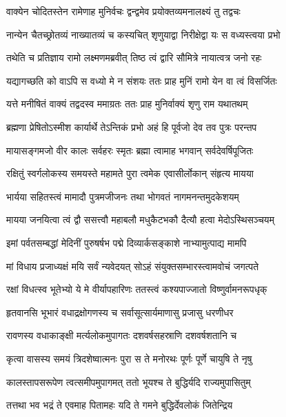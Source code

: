 \twolineshloka
{वाक्येन चोदितस्तेन रामेणाह मुनिर्वचः}
{द्वन्द्वमेव प्रयोक्तव्यमनालक्ष्यं तु तद्वचः} %

\twolineshloka
{नान्येन चैतच्छ्रोतव्यं नाख्यातव्यं च कस्यचित्}
{शृणुयाद्वा निरीक्षेद्वा यः स वध्यस्त्वया प्रभो} %

\twolineshloka
{तथेति च प्रतिज्ञाय रामो लक्ष्मणमब्रवीत्}
{तिष्ठ त्वं द्वारि सौमित्रे नायात्वत्र जनो रहः} %

\twolineshloka
{यद्यागच्छति को वाऽपि स वध्यो मे न संशयः}
{ततः प्राह मुनिं रामो येन वा त्वं विसर्जितः} %

\twolineshloka
{यत्ते मनीषितं वाक्यं तद्वदस्व ममाग्रतः}
{ततः प्राह मुनिर्वाक्यं शृणु राम यथातथम्} %

\twolineshloka
{ब्रह्मणा प्रेषितोऽस्मीश कार्यार्थे तेऽन्तिकं प्रभो}
{अहं हि पूर्वजो देव तव पुत्रः परन्तप} %

\twolineshloka
{मायासङ्गमजो वीर कालः सर्वहरः स्मृतः}
{ब्रह्मा त्वामाह भगवान् सर्वदेवर्षिपूजितः} %

\twolineshloka
{रक्षितुं स्वर्गलोकस्य समयस्ते महामते}
{पुरा त्वमेक एवासीर्लोकान् संहृत्य मायया} %

\twolineshloka
{भार्यया सहितस्त्वं मामादौ पुत्रमजीजनः}
{तथा भोगवतं नागमनन्तमुदकेशयम्} %

\twolineshloka
{मायया जनयित्वा त्वं द्वौ ससत्त्वौ महाबलौ}
{मधुकैटभकौ दैत्यौ हत्वा मेदोऽस्थिसञ्चयम्} %

\twolineshloka
{इमां पर्वतसम्बद्धां मेदिनीं पुरुषर्षभ}
{पद्मे दिव्यार्कसङ्काशे नाभ्यामुत्पाद्य मामपि} %

\twolineshloka
{मां विधाय प्रजाध्यक्षं मयि सर्वं न्यवेदयत्}
{सोऽहं संयुक्तसम्भारस्त्वामवोचं जगत्पते} %

\twolineshloka
{रक्षां विधत्स्व भूतेभ्यो ये मे वीर्यापहारिणः}
{ततस्त्वं कश्यपाज्जातो विष्णुर्वामनरूपधृक्} %

\twolineshloka
{हृतवानसि भूभारं वधाद्रक्षोगणस्य च}
{सर्वासूत्सार्यमाणासु प्रजासु धरणीधर} %

\twolineshloka
{रावणस्य वधाकाङ्क्षी मर्त्यलोकमुपागतः}
{दशवर्षसहस्राणि दशवर्षशतानि च} %

\twolineshloka
{कृत्वा वासस्य समयं त्रिदशेष्वात्मनः पुरा}
{स ते मनोरथः पूर्णः पूर्णे चायुषि ते नृषु} %

\twolineshloka
{कालस्तापसरूपेण त्वत्समीपमुपागमत्}
{ततो भूयश्च ते बुद्धिर्यदि राज्यमुपासितुम्} %

\twolineshloka
{तत्तथा भव भद्रं ते एवमाह पितामहः}
{यदि ते गमने बुद्धिर्देवलोकं जितेन्द्रिय} %

